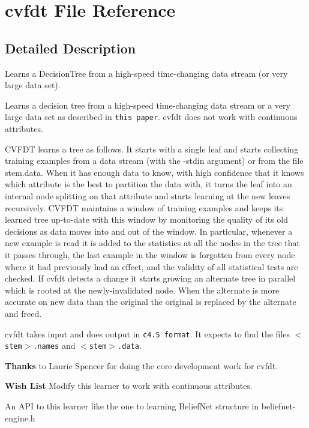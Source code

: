 \section{cvfdt File Reference}
\label{cvfdt}


\subsection{Detailed Description}
Learns a Decision\-Tree from a high-speed time-changing data stream (or very large data set). 

Learns a decision tree from a high-speed time-changing data stream or a very large data set as described in {\tt this paper}. cvfdt does not work with continuous attributes.

CVFDT learns a tree as follows. It starts with a single leaf and starts collecting training examples from a data stream (with the -stdin argument) or from the file stem.data. When it has enough data to know, with high confidence that it knows which attribute is the best to partition the data with, it turns the leaf into an internal node splitting on that attribute and starts learning at the new leaves recursively. CVFDT maintains a window of training examples and keeps its learned tree up-to-date with this window by monitoring the quality of its old decisions as data moves into and out of the window. In particular, whenever a new example is read it is added to the statistics at all the nodes in the tree that it passes through, the last example in the window is forgotten from every node where it had previously had an effect, and the validity of all statistical tests are checked. If cvfdt detects a change it starts growing an alternate tree in parallel which is rooted at the newly-invalidated node. When the alternate is more accurate on new data than the original the original is replaced by the alternate and freed.

cvfdt takes input and does output in {\tt c4.5 format}. It expects to find the files {\tt $<$stem$>$.names} and {\tt $<$stem$>$.data}.

\begin{Desc}
\item[{\bf Thanks}]to Laurie Spencer for doing the core development work for cvfdt. \end{Desc}


\begin{Desc}
\item[{\bf Wish List}]Modify this learner to work with continuous attributes. 

An API to this learner like the one to learning Belief\-Net structure in beliefnet-engine.h \end{Desc}


